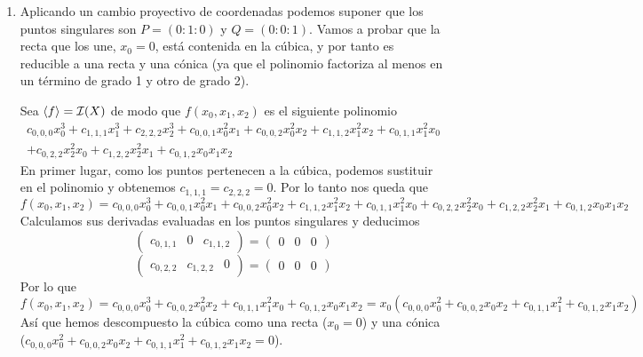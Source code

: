 \documentclass[twoside]{article}
\begin{document}
\begin{solucion}
\begin{enumerate}
\item Aplicando un cambio proyectivo de coordenadas podemos suponer que los puntos singulares son $P=(0:1:0)$ y $Q=(0:0:1)$. Vamos a probar que la recta que los une, $x_0=0$, está contenida en la cúbica, y por tanto es reducible a una recta y una cónica (ya que el polinomio factoriza al menos en un término de grado 1 y otro de grado 2).

Sea $\langle f\rangle= \mathcal{I}(X)$ de modo que $f(x_0,x_1,x_2)$ es el siguiente polinomio 
\begin{gather*}
c_{0,0,0}x_0^3+c_{1,1,1}x_1^3+c_{2,2,2}x_2^3+c_{0,0,1}x_0^2x_1+c_{0,0,2}x_0^2x_2+c_{1,1,2}x_1^2x_2+c_{0,1,1}x_1^2x_0\\
+c_{0,2,2}x_2^2x_0+c_{1,2,2}x_2^2x_1+c_{0,1,2}x_0x_1x_2
\end{gather*}
En primer lugar, como los puntos pertenecen a la cúbica, podemos sustituir en el polinomio y obtenemos $c_{1,1,1}=c_{2,2,2}=0$. Por lo tanto nos queda que
$$f(x_0,x_1,x_2)=c_{0,0,0}x_0^3+c_{0,0,1}x_0^2x_1+c_{0,0,2}x_0^2x_2+c_{1,1,2}x_1^2x_2+c_{0,1,1}x_1^2x_0
+c_{0,2,2}x_2^2x_0+c_{1,2,2}x_2^2x_1+c_{0,1,2}x_0x_1x_2$$
Calculamos sus derivadas evaluadas en los puntos singulares y deducimos
$$\begin{pmatrix}
c_{0,1,1} & 0 & c_{1,1,2}
\end{pmatrix}=\begin{pmatrix}
0 & 0 & 0
\end{pmatrix}$$
$$\begin{pmatrix}
c_{0,2,2} & c_{1,2,2} & 0
\end{pmatrix}=\begin{pmatrix}
0 & 0 & 0
\end{pmatrix}$$
Por lo que
$$f(x_0,x_1,x_2)=c_{0,0,0}x_0^3+c_{0,0,2}x_0^2x_2+c_{0,1,1}x_1^2x_0
+c_{0,1,2}x_0x_1x_2=x_0(c_{0,0,0}x_0^2+c_{0,0,2}x_0x_2+c_{0,1,1}x_1^2
+c_{0,1,2}x_1x_2)$$
Así que hemos descompuesto la cúbica como una recta ($x_0=0$) y una cónica ($c_{0,0,0}x_0^2+c_{0,0,2}x_0x_2+c_{0,1,1}x_1^2
+c_{0,1,2}x_1x_2=0$).
\end{enumerate}
\end{solucion}
\end{document}
